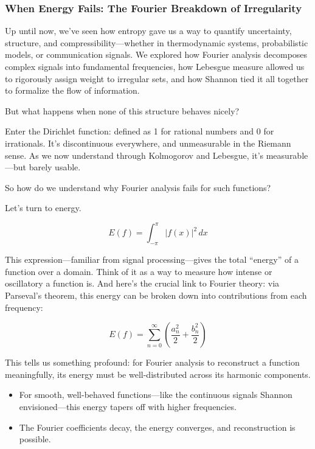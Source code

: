 \subsubsection{When Energy Fails: The Fourier Breakdown of Irregularity}

Up until now, we’ve seen how entropy gave us a way to quantify uncertainty, structure, and compressibility—whether in thermodynamic systems, probabilistic models, or communication signals. We explored how Fourier analysis decomposes complex signals into fundamental frequencies, how Lebesgue measure allowed us to rigorously assign weight to irregular sets, and how Shannon tied it all together to formalize the flow of information.

But what happens when none of this structure behaves nicely?

Enter the Dirichlet function: defined as 1 for rational numbers and 0 for irrationals. It’s discontinuous everywhere, and unmeasurable in the Riemann sense. As we now understand through Kolmogorov and Lebesgue, it's measurable—but barely usable.

So how do we understand why Fourier analysis fails for such functions?

Let’s turn to energy.

\[
E(f) = \int_{-\pi}^{\pi} |f(x)|^2 \,dx
\]

This expression—familiar from signal processing—gives the total “energy” of a function over a domain. Think of it as a way to measure how intense or oscillatory a function is. And here’s the crucial link to Fourier theory: via Parseval’s theorem, this energy can be broken down into contributions from each frequency:

\[
E(f) = \sum_{n=0}^{\infty} \left( \frac{a_n^2}{2} + \frac{b_n^2}{2} \right)
\]

This tells us something profound: for Fourier analysis to reconstruct a function meaningfully, its energy must be well-distributed across its harmonic components.

\begin{itemize}
    \item For smooth, well-behaved functions—like the continuous signals Shannon envisioned—this energy tapers off with higher frequencies.
    \item The Fourier coefficients decay, the energy converges, and reconstruction is possible.
\end{itemize}

